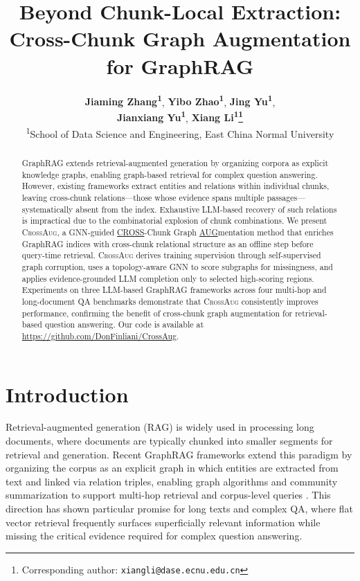 \documentclass[11pt]{article}
\title{Beyond Chunk-Local Extraction: Cross-Chunk Graph Augmentation for GraphRAG}
\author{
\textbf{Jiaming Zhang\textsuperscript{1}},
\textbf{Yibo Zhao\textsuperscript{1}},
\textbf{Jing Yu\textsuperscript{1}},
\\
\textbf{Jianxiang Yu\textsuperscript{1}},
\textbf{Xiang Li\textsuperscript{1}\thanks{Corresponding author: \texttt{xiangli@dase.ecnu.edu.cn}}}
\\
\textsuperscript{1}School of Data Science and Engineering, East China Normal University
}
\newcommand{\ours}{\textsc{CrossAug}\xspace}
\begin{document}
\maketitle
\begin{abstract}
GraphRAG extends retrieval-augmented generation by organizing corpora as explicit knowledge graphs, enabling graph-based retrieval for complex question answering. However, existing frameworks extract entities and relations within individual chunks, leaving cross-chunk relations---those whose evidence spans multiple passages---systematically absent from the index. Exhaustive LLM-based recovery of such relations is impractical due to the combinatorial explosion of chunk combinations. We present \ours, a GNN-guided \underline{CROSS}-Chunk Graph \underline{AUG}mentation method that enriches GraphRAG indices with cross-chunk relational structure as an offline step before query-time retrieval. \ours derives training supervision through self-supervised graph corruption, uses a topology-aware GNN to score subgraphs for missingness, and applies evidence-grounded LLM completion only to selected high-scoring regions. Experiments on three LLM-based GraphRAG frameworks across four multi-hop and long-document QA benchmarks demonstrate that \ours consistently improves performance, confirming the benefit of cross-chunk graph augmentation for retrieval-based question answering. Our code is available at \url{https://github.com/DonFinliani/CrossAug}.

\end{abstract}

\section{Introduction}

Retrieval-augmented generation (RAG) is widely used in processing long documents, where documents are typically chunked into smaller segments for retrieval and generation. Recent GraphRAG frameworks extend this paradigm by organizing the corpus as an explicit graph in which entities are extracted from text and linked via relation triples, enabling graph algorithms and community summarization to support multi-hop retrieval and corpus-level queries \citep{edge2024local, gutierrez2024hipporag}. This direction has shown particular promise for long texts and complex QA, where flat vector retrieval frequently surfaces superficially relevant information while missing the critical evidence required for complex question answering.
\end{document}
